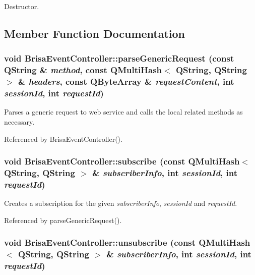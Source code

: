 Destructor. 

\subsection{Member Function Documentation}
\hypertarget{classBrisaUpnp_1_1BrisaEventController_a0324a5ff469a2ecdaa569dfbd6517111}{
\subsubsection[{parseGenericRequest}]{\setlength{\rightskip}{0pt plus 5cm}void BrisaEventController::parseGenericRequest (const QString \& {\em method}, \/  const QMultiHash$<$ QString, QString $>$ \& {\em headers}, \/  const QByteArray \& {\em requestContent}, \/  int {\em sessionId}, \/  int {\em requestId})}}
\label{classBrisaUpnp_1_1BrisaEventController_a0324a5ff469a2ecdaa569dfbd6517111}


Parses a generic request to web service and calls the local related methods as necessary. 

Referenced by BrisaEventController().\hypertarget{classBrisaUpnp_1_1BrisaEventController_a3037ef7625561ca5576b70c56fe6bcb4}{
\subsubsection[{subscribe}]{\setlength{\rightskip}{0pt plus 5cm}void BrisaEventController::subscribe (const QMultiHash$<$ QString, QString $>$ \& {\em subscriberInfo}, \/  int {\em sessionId}, \/  int {\em requestId})}}
\label{classBrisaUpnp_1_1BrisaEventController_a3037ef7625561ca5576b70c56fe6bcb4}


Creates a subscription for the given {\itshape subscriberInfo\/}, {\itshape sessionId\/} and {\itshape requestId\/}. 

Referenced by parseGenericRequest().\hypertarget{classBrisaUpnp_1_1BrisaEventController_a56b890f9eb211152063260f07d40f5f0}{
\subsubsection[{unsubscribe}]{\setlength{\rightskip}{0pt plus 5cm}void BrisaEventController::unsubscribe (const QMultiHash$<$ QString, QString $>$ \& {\em subscriberInfo}, \/  int {\em sessionId}, \/  int {\em requestId})}}
\label{classBrisaUpnp_1_1BrisaEventController_a56b890f9eb211152063260f07d40f5f0}


